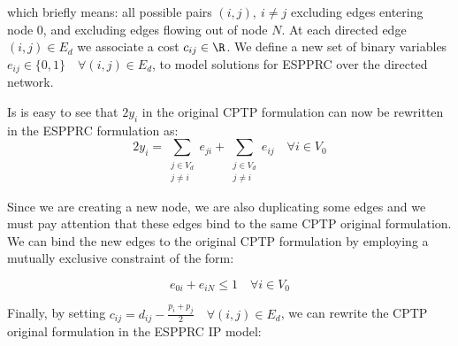 which briefly means: all possible pairs $(i, j),\ i \ne j$ excluding edges entering node $0$, and excluding edges flowing out of node $N$.
At each directed edge $(i, j) \in E_d$ we associate a cost $c_{ij} \in \R$.
We define a new set of binary variables $e_{ij} \in \{ 0, 1 \} \quad \forall (i, j) \in E_d$, to model solutions for ESPPRC over the directed network.

Is is easy to see that $2 y_i$ in the original CPTP formulation can now be rewritten in the ESPPRC formulation as:
\begin{equation}
	2 y_i = \sum_{\substack{j \in V_d \\ j \ne i}} e_{ji} + \sum_{\substack{j \in V_d \\ j \ne i}} e_{ij} \quad \forall i \in V_0
\end{equation}

Since we are creating a new node, we are also duplicating some edges and we must pay attention that these edges bind to the same CPTP original formulation.
We can bind the new edges to the original CPTP formulation by employing a mutually exclusive constraint of the form:

\begin{equation}
	e_{0i} + e_{iN} \le 1 \quad \forall i \in V_0
\end{equation}

Finally, by setting $c_{ij} = d_{ij} - \frac{p_i + p_j}{2} \quad \forall (i, j) \in E_d$, we can rewrite the CPTP original formulation in the ESPPRC IP model:

